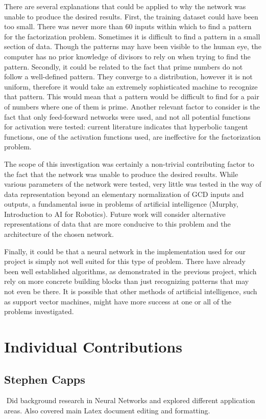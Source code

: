 \documentclass[11pt]{article}
\begin{document}
\indent There are several explanations that could be applied to why the network was unable to produce the desired results.  First, the training dataset could have been too small.  There was never more than 60 inputs within which to find a pattern for the factorization problem. Sometimes it is difficult to find a pattern in a small section of data.  Though the patterns may have been visible to the human eye, the computer has no prior knowledge of divisors to rely on when trying to find the pattern.  Secondly, it could be related to the fact that prime numbers do not follow a well-defined pattern.  They converge to a distribution, however it is not uniform, therefore it would take an extremely sophisticated machine to recognize that pattern.  This would mean that a pattern would be difficult to find for a pair of numbers where one of them is prime. Another relevant factor to consider is the fact that only feed-forward networks were used, and not all potential functions for activation were tested: current literature indicates that hyperbolic tangent functions, one of the activation functions used, are ineffective for the factorization problem. 

\indent The scope of this investigation was certainly a non-trivial contributing factor to the fact that the network was unable to produce the desired results. While various parameters of the network were tested, very little was tested in the way of data representation beyond an elementary normalization of GCD inputs and outputs, a fundamental issue in problems of artificial intelligence (Murphy, Introduction to AI for Robotics). Future work will consider alternative representations of data that are more conducive to this problem and the architecture of the chosen network. 

\indent Finally, it could be that a neural network in the implementation used for our project is simply not well suited for this type of problem.  There have already been well established algorithms, as demonstrated in the previous project, which rely on more concrete building blocks than just recognizing patterns that may not even be there. It is possible that other methods of artificial intelligence, such as support vector machines, might have more success at one or all of the problems investigated. 
\indent  
\section{Individual Contributions}
\subsection{Stephen Capps}$ $
\indent Did background research in Neural Networks and explored different application areas. Also covered main Latex document editing and formatting.
\end{document}
